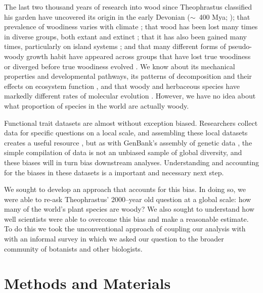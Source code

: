 \documentclass[a4paper,12pt]{article}
\begin{document}
The last two thousand years of research into wood since Theophrastus
classified his garden have uncovered its origin in the early Devonian
($\sim$~400 Mya; \citealt{gerrienne2011simple}); that prevalence of
woodiness varies with climate \citep{Molesheihgt}; that wood has been
lost many times in diverse groups, both extant and extinct
\citep{judd1994}; that it has also been gained many times,
particularly on island systems \citep{Carlquist1974,Givnish1998};
and that many different forms of pseudo-woody growth
habit have appeared across groups that have lost true woodiness or
diverged before true woodiness evolved \citep{Cornwellwood}.  We know
about its mechanical properties and developmental pathways, its
patterns of decomposition and their effects on ecosystem function
\citep{Cornwellwood}, and that woody and herbaceous species have
markedly different rates of molecular evolution \citep{SmithDonoghue}.
%
However, we have no idea about what proportion of species in the world
are actually woody.

Functional trait datasets are almost without exception biased.  
Researchers collect data for specific questions on a local scale, and
assembling these local datasets creates a useful resource \citep{kattge2011try}, 
but as with GenBank's assembly of genetic data \citep{smith2011understanding},
the simple compilation of data is not an unbiased sample of global diversity, and 
these biases will in turn bias downstream analyses.
Understanding and accounting for the biases in these datasets is a 
important and necessary next step.

We sought to develop an approach that accounts for this bias.  In doing so, we 
were able to re-ask Theophrastus' 2000--year old
question at a global scale: how many of the world's plant species are
woody?
%
We also sought to understand how well scientists were able to overcome this bias and make a reasonable estimate.  To do this 
we took the unconventional approach of coupling our
analysis with with an informal survey in which we asked our question
to the broader community of botanists and other biologists.
% 
%

\section{Methods and Materials}
\end{document}
